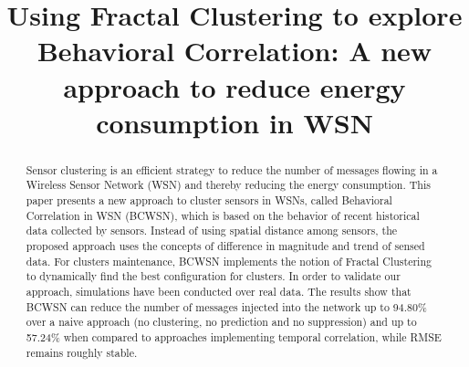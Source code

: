 \documentclass{acm_proc_article-sp}
\begin{document}
%

\title{Using Fractal Clustering to explore Behavioral Correlation: A new
approach to reduce energy consumption in WSN}



\maketitle


\begin{abstract}

Sensor clustering is an efficient strategy to reduce the number of messages
flowing in a Wireless Sensor Network (WSN) and thereby reducing the energy
consumption. This paper presents a new approach to cluster sensors in WSNs,
called Behavioral Correlation in WSN (BCWSN), which is based on the behavior of
recent historical data collected by sensors. Instead of using spatial distance
among sensors, the proposed approach uses the concepts of difference in
magnitude and trend of sensed data. For clusters maintenance, BCWSN implements
the notion of Fractal Clustering to dynamically find the best configuration for
clusters. In order to validate our approach, simulations have been conducted
over real data. The results show that BCWSN can reduce the number of messages
injected into the network up to 94.80\% over a naive approach (no clustering, no
prediction and no suppression) and up to 57.24\% when compared to approaches
implementing temporal correlation, while RMSE remains roughly stable.

\end{abstract}


\end{document}
